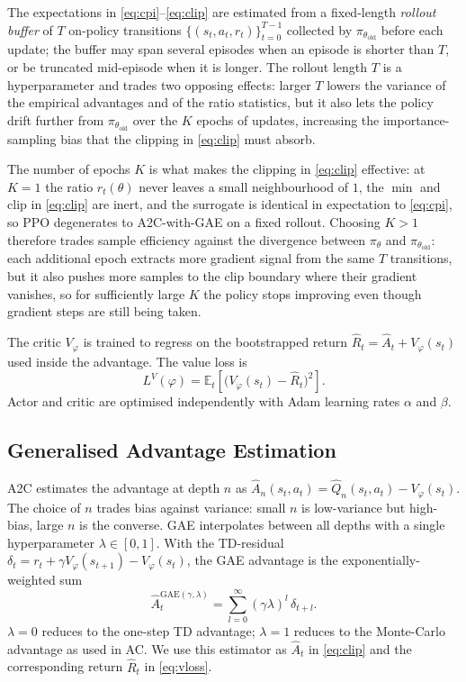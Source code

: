 \documentclass{article}
\theoremstyle{plain}
\theoremstyle{definition}
\theoremstyle{remark}
\begin{document}
The expectations in \cref{eq:cpi}--\cref{eq:clip} are estimated from a fixed-length \emph{rollout buffer} of $T$ on-policy transitions $\{(s_t,a_t,r_t)\}_{t=0}^{T-1}$ collected by $\pi_{\theta_{\mathrm{old}}}$ before each update; the buffer may span several episodes when an episode is shorter than $T$, or be truncated mid-episode when it is longer. The rollout length $T$ is a hyperparameter and trades two opposing effects: larger $T$ lowers the variance of the empirical advantages and of the ratio statistics, but it also lets the policy drift further from $\pi_{\theta_{\mathrm{old}}}$ over the $K$ epochs of updates, increasing the importance-sampling bias that the clipping in \cref{eq:clip} must absorb.

The number of epochs $K$ is what makes the clipping in \cref{eq:clip} effective: at $K=1$ the ratio $r_t(\theta)$ never leaves a small neighbourhood of $1$, the $\min$ and $\mathrm{clip}$ in \cref{eq:clip} are inert, and the surrogate is identical in expectation to \cref{eq:cpi}, so PPO degenerates to A2C-with-GAE on a fixed rollout. Choosing $K>1$ therefore trades sample efficiency against the divergence between $\pi_\theta$ and $\pi_{\theta_{\mathrm{old}}}$: each additional epoch extracts more gradient signal from the same $T$ transitions, but it also pushes more samples to the clip boundary where their gradient vanishes, so for sufficiently large $K$ the policy stops improving even though gradient steps are still being taken.

The critic $V_\varphi$ is trained to regress on the bootstrapped return $\hat R_t = \hat A_t + V_\varphi(s_t)$ used inside the advantage. The value loss is
\begin{equation}
    L^{V}(\varphi) = \mathbb{E}_t\!\left[\big(V_\varphi(s_t) - \hat R_t\big)^{2}\right].
    \label{eq:vloss}
\end{equation}
Actor and critic are optimised independently with Adam learning rates $\alpha$ and $\beta$.

\subsection{Generalised Advantage Estimation}\label{sec:theory:gae}

A2C estimates the advantage at depth $n$ as $\hat A_n(s_t,a_t)=\hat Q_n(s_t,a_t)-V_\varphi(s_t)$. The choice of $n$ trades bias against variance: small $n$ is low-variance but high-bias, large $n$ is the converse. GAE \cite{schulman2016gae} interpolates between all depths with a single hyperparameter $\lambda\in[0,1]$. With the TD-residual $\delta_t = r_t + \gamma V_\varphi(s_{t+1}) - V_\varphi(s_t)$, the GAE advantage is the exponentially-weighted sum
\begin{equation}
    \hat A_t^{\mathrm{GAE}(\gamma,\lambda)} = \sum_{l=0}^{\infty} (\gamma\lambda)^{l}\,\delta_{t+l}.
    \label{eq:gae}
\end{equation}
$\lambda=0$ reduces to the one-step TD advantage; $\lambda=1$ reduces to the Monte-Carlo advantage as used in AC. We use this estimator as $\hat A_t$ in \cref{eq:clip} and the corresponding return $\hat R_t$ in \cref{eq:vloss}.
\end{document}

